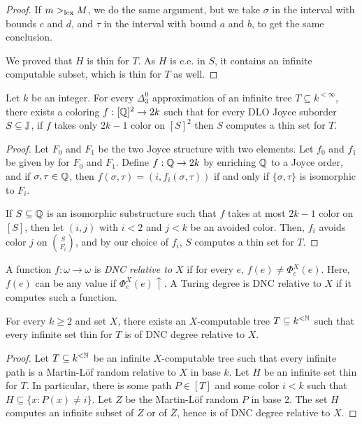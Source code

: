 \begin{proof}
  If $m>_{\mathrm{lex}} M$, we do the same argument, but we take $\sigma$ in the interval with bounds $c$ and $d$, and $\tau$ in the interval with bound $a$ and $b$, to get the same conclusion.
  
  We proved that $H$ is thin
  for $T$. As $H$ is c.e. in $S$, it contains an infinite computable subset,
  which is thin for $T$ as well.
\end{proof}
\begin{corollary}
  Let $k$ be an integer.
  For every $\Delta^0_3$ approximation of an infinite tree $T\subseteq k^{<\infty}$, there exists a coloring
  $f:[\mathbb{Q}]^2\to 2k$ such that for every DLO Joyce suborder $S\subseteq \mathbb{J}$, if $f$ takes only $2k-1$ color on $[S]^2$ then $S$ computes a thin set for $T$.
\end{corollary}
\begin{proof}
  Let $F_0$ and $F_1$ be the two Joyce structure with two elements. Let $f_0$ and $f_1$  be given by  for $F_0$ and $F_1$. Define $f:\mathbb{Q}\to2k$ by enriching $\mathbb{Q}$ to a Joyce order, and if $\sigma,\tau\in\mathbb{Q}$, then $f(\sigma,\tau)=(i,f_i(\sigma,\tau))$ if and only if $\{\sigma,\tau\}$ is isomorphic to $F_i$.

  If $S\subseteq\mathbb{Q}$ is an isomorphic substructure such that $f$ takes at most $2k-1$ color on $[S]$, then let $(i,j)$ with $i<2$ and $j<k$ be an avoided color. Then, $f_i$ avoids color $j$ on ${S\choose F_i}$, and by our choice of $f_i$, $S$ computes a thin set for $T$.
\end{proof}

\begin{definition}
A function $f: \omega \to \omega$ is \emph{DNC relative to $X$}
if for every $e$, $f(e) \neq \Phi^X_e(e)$. Here, $f(e)$ can be any value if $\Phi^X_e(e)\uparrow$. A Turing degree is DNC relative to $X$ if it computes such a function.
\end{definition}


\begin{lemma}\label{lem:rwkl-dnc}
For every $k \geq 2$ and set $X$, there exists an $X$-computable tree $T \subseteq k^{<\mathbb{N}}$
such that every infinite set thin for $T$ is of DNC degree relative to $X$.
\end{lemma}
\begin{proof}
Let $T \subseteq k^{<\mathbb{N}}$ be an infinite $X$-computable tree such that every infinite path is a Martin-L\"of random relative to $X$ in base $k$. Let $H$ be an infinite set thin for $T$. In particular, there is some path $P \in [T]$ and some color $i < k$ such that $H \subseteq \{ x: P(x) \neq i \}$. Let $Z$ be the Martin-L\"of random $P$ in base 2. The set $H$ computes an infinite subset of $Z$ or of $\overline{Z}$, hence is of DNC degree relative to $X$.
\end{proof}

